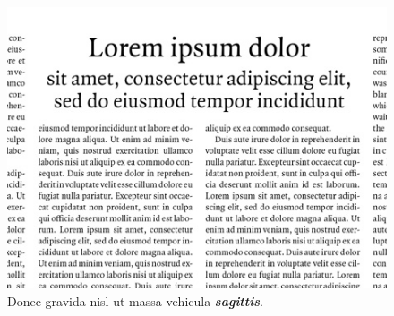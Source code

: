 \documentclass{article} %
\begin{document}
	\begin{figure}[H]
		\includegraphics[width=12cm]{Lorem_Ipsum}
		\centering
		\color{blue}
		\caption{Donec gravida nisl ut massa vehicula \textbf{\textit{sagittis}}.}\label{visina8}
	\end{figure}
\end{document}
